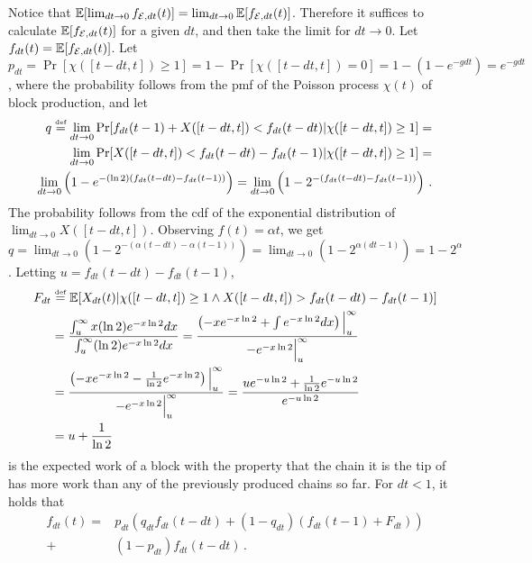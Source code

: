 Notice that $\mathop{{}\mathbb{E}}[\lim_{dt \to 0} f_{\mathcal{E},dt}(t)] = \lim_{dt \to 0} \mathop{{}\mathbb{E}}[f_{\mathcal{E},dt}(t)]$.
Therefore it suffices to calculate $\mathop{{}\mathbb{E}}[f_{\mathcal{E},dt}(t)]$ for a given $dt$,
and then take the limit for $dt \to 0$.
Let $f_{dt}(t) = \mathop{{}\mathbb{E}}[f_{\mathcal{E},dt}(t)]$.
Let $p_{dt} = \Pr[\chi([t - dt, t]) \geq 1] = 1 - \Pr[\chi([t - dt, t]) = 0] = 1 - (1 - e^{-g dt}) = e^{-g dt}$, where
the probability follows from the pmf of the Poisson process $\chi(t)$
of block production,
and let
\begin{align*}
  q \stackrel{\text{\tiny def}}{=} \lim_{dt \to 0} \Pr[f_{dt}(t - 1) + X([t - dt, t]) < f_{dt}(t - dt)|\chi([t - dt, t]) \geq 1] =\\
           \lim_{dt \to 0} \Pr[X([t - dt, t]) < f_{dt}(t - dt) - f_{dt}(t - 1)|\chi([t - dt, t]) \geq 1] = \\
           \lim_{dt \to 0} \left( 1 - e^{-(\ln2) (f_{dt}(t - dt) - f_{dt}(t - 1))}\right) =
           \lim_{dt \to 0} \left(1 - 2^{-(f_{dt}(t - dt) - f_{dt}(t - 1))}\right)
  \,.
\end{align*}
The probability follows from the cdf of the exponential distribution of $\lim_{dt \to 0} X([t - dt, t])$.
Observing $f(t) = \alpha t$, we get $q = \lim_{dt \to 0}\left(1 - 2^{-(\alpha(t - dt) - \alpha(t - 1))}\right)
= \lim_{dt \to 0}\left(1 - 2^{\alpha (dt - 1)}\right) = 1 - 2^\alpha$.
Letting $u = f_{dt}(t - dt) - f_{dt}(t - 1)$,
\begin{align*}
  F_{dt} &\stackrel{\text{\tiny def}}{=} \mathop{{}\mathbb{E}}[X_{dt}(t)|\chi([t - dt, t]) \geq 1 \land X([t - dt, t]) > f_{dt}(t - dt) - f_{dt}(t - 1)]\\
         &= \frac{\int_u^\infty x (\ln2) e^{-x \ln2} dx}{\int_u^\infty (\ln2) e^{-x \ln2} dx}
          = \frac{\left(-x e^{-x \ln2} + \int{e^{-x \ln2} dx}\right)\Big|_u^\infty}{-e^{-x \ln2}\Big|_u^\infty}\\
         &= \frac{\left(-x e^{-x \ln2} - \frac{1}{\ln2} e^{-x \ln2}\right)\Big|_u^\infty}{-e^{-x \ln2}\Big|_u^\infty}
          = \frac{u e^{-u\ln2} + \frac{1}{\ln2} e^{-u \ln2}}{e^{-u \ln2}}\\
         &= u + \frac{1}{\ln2}\,
\end{align*}
is the expected work of a block with the property that the chain it is the tip of has more work than any of the
previously produced chains so far.
For $dt < 1$, it holds that
\begin{align*}
  f_{dt}(t) =
      &p_{dt}\left(q_{dt}f_{dt}(t - dt) + (1 - q_{dt})(f_{dt}(t - 1) + F_{dt})\right)\\
    + &(1 - p_{dt})f_{dt}(t - dt)\,.
\end{align*}
